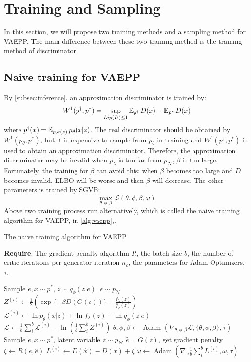 \section{Training and Sampling}\label{sec:vaepp}
In this section, we will propose two training methods and a sampling method for VAEPP. The main difference between these two training method is the training method of discriminator. 

\subsection{Naive training for VAEPP} \label{subsec:naive_vaepp}
By \cref{subsec:inference}, an approximation discriminator is trained by:
\begin{equation*}
	W^1(p^\dag, p^*) = \sup_{Lip(D) \leq 1} \operatorname{\mathbb{E}}_{p^\dag} D(x) - \operatorname{\mathbb{E}}_{p^*} D(x)
\end{equation*} 
where $p^\dag(x) = \operatorname{\mathbb{E}}_{p_\mathcal{N}(z)} p_\theta(x|z)$. The real discriminator should be obtained by $W^1(p_\theta, p^*)$, but it is expensive to sample from $p_\theta$ in training and $W^1(p^\dag, p^*)$ is used to obtain an approximation discriminator. Therefore, the approximation discriminator may be invalid when $p_\lambda$ is too far from $p_\mathcal{N}$, \IE $\beta$ is too large. Fortunately, the training for $\beta$ can avoid this: when $\beta$ becomes too large and $D$ becomes invalid, ELBO will be worse and then $\beta$ will decrease. The other parameters is trained by SGVB:
\begin{equation*}
	\max_{\theta, \phi, \beta} \mathcal{L}(\theta, \phi, \beta, \omega)
\end{equation*}
Above two training process run alternatively, which is called the naive training algorithm for VAEPP, in \cref{alg:vaepp},. 
\begin{algorithm}[tb]
\caption{The naive training algorithm for VAEPP}
\label{alg:vaepp}
\textbf{Require}: The gradient penalty algorithm $R$, the batch size $b$, the number of critic iterations per generator iteration $n_c$, the parameters for Adam Optimizers, $\tau$. 

\begin{algorithmic}[1] %
\STATE Sample $e, x \sim p^*$, $z \sim q_\phi(z|e)$, $\epsilon \sim p_\mathcal{N}$
\STATE $Z^{(i)} \gets \frac{1}{2}(\exp\{-\beta D(G(\epsilon))\} + \frac{f_\lambda(z)}{\hat{q}_\phi(z)})$
\STATE $\mathcal{L}^{(i)} \gets \ln p_\theta(x|z) + \ln f_\lambda(z) - \ln q_\phi(z|e)$
\ENDFOR
\STATE $\mathcal{L} \gets \frac{1}{b}\sum_{i}^b \mathcal{L}^{(i)} - \ln (\frac{1}{b}\sum_{i}^b Z^{(i)})$
\STATE $\theta, \phi, \beta \gets $ Adam $(\nabla_{\theta, \phi, \beta} \mathcal{L}, \{\theta, \phi, \beta\}, \tau)$
\ENDFOR
{}
\STATE Sample $e, x \sim p^*$, latent variable $z \sim p_\mathcal{N}$
\STATE	$\hat{e} = G(z)$, get gradient penalty $\zeta \gets R(e, \hat{e})$
\STATE $L^{(i)} \gets D(\hat{x}) - D(x) + \zeta$
\ENDFOR
\STATE $\omega \gets $ Adam $(\nabla_{\omega} \frac{1}{b}\sum_{i}^b L^{(i)}, \omega, \tau)$
\ENDWHILE
\end{algorithmic}
\end{algorithm}

